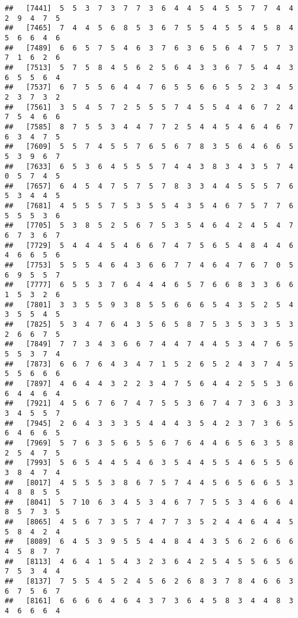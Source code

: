 \documentclass[
]{book}
\begin{document}
\begin{verbatim}
##   [7441]  5  5  3  7  3  7  7  3  6  4  4  5  4  5  5  7  7  4  4  2  9  4  7  5
##   [7465]  7  4  4  5  6  8  5  3  6  7  5  5  4  5  5  4  5  8  4  5  6  6  4  6
##   [7489]  6  6  5  7  5  4  6  3  7  6  3  6  5  6  4  7  5  7  3  7  1  6  2  6
##   [7513]  5  7  5  8  4  5  6  2  5  6  4  3  3  6  7  5  4  4  3  6  5  5  6  4
##   [7537]  6  7  5  5  6  4  4  7  6  5  5  6  6  5  5  2  3  4  5  2  3  7  3  2
##   [7561]  3  5  4  5  7  2  5  5  5  7  4  5  5  4  4  6  7  2  4  7  5  4  6  6
##   [7585]  8  7  5  5  3  4  4  7  7  2  5  4  4  5  4  6  4  6  7  6  3  4  7  5
##   [7609]  5  5  7  4  5  5  7  6  5  6  7  8  3  5  6  4  6  6  5  5  3  9  6  7
##   [7633]  6  5  3  6  4  5  5  5  7  4  4  3  8  3  4  3  5  7  4  0  5  7  4  5
##   [7657]  6  4  5  4  7  5  7  5  7  8  3  3  4  4  5  5  5  7  6  5  3  4  4  5
##   [7681]  4  5  5  5  7  5  3  5  5  4  3  5  4  6  7  5  7  7  6  5  5  5  3  6
##   [7705]  5  3  8  5  2  5  6  7  5  3  5  4  6  4  2  4  5  4  7  6  7  3  6  7
##   [7729]  5  4  4  4  5  4  6  6  7  4  7  5  6  5  4  8  4  4  6  4  6  6  5  6
##   [7753]  5  5  5  4  6  4  3  6  6  7  7  4  6  4  7  6  7  0  5  6  9  5  5  7
##   [7777]  6  5  5  3  7  6  4  4  4  6  5  7  6  6  8  3  3  6  6  1  5  3  2  6
##   [7801]  3  3  5  5  9  3  8  5  5  6  6  6  5  4  3  5  2  5  4  3  5  5  4  5
##   [7825]  5  3  4  7  6  4  3  5  6  5  8  7  5  3  5  3  3  5  3  2  6  6  7  5
##   [7849]  7  7  3  4  3  6  6  7  4  4  7  4  4  5  3  4  7  6  5  5  5  3  7  4
##   [7873]  6  6  7  6  4  3  4  7  1  5  2  6  5  2  4  3  7  4  5  5  5  6  6  6
##   [7897]  4  6  4  4  3  2  2  3  4  7  5  6  4  4  2  5  5  3  6  6  4  4  6  4
##   [7921]  4  5  6  7  6  7  4  7  5  5  3  6  7  4  7  3  6  3  3  3  4  5  5  7
##   [7945]  2  6  4  3  3  3  5  4  4  4  3  5  4  2  3  7  3  6  5  6  4  6  6  5
##   [7969]  5  7  6  3  5  6  5  5  6  7  6  4  4  6  5  6  3  5  8  2  5  4  7  5
##   [7993]  5  6  5  4  4  5  4  6  3  5  4  4  5  5  4  6  5  5  6  3  8  4  7  4
##   [8017]  4  5  5  5  3  8  6  7  5  7  4  4  5  6  5  6  6  5  3  4  8  8  5  5
##   [8041]  5  7 10  6  3  4  5  3  4  6  7  7  5  5  3  4  6  6  4  8  5  7  3  5
##   [8065]  4  5  6  7  3  5  7  4  7  7  3  5  2  4  4  6  4  4  5  5  8  4  2  4
##   [8089]  6  4  5  3  9  5  5  4  4  8  4  4  3  5  6  2  6  6  6  4  5  8  7  7
##   [8113]  4  6  4  1  5  4  3  2  3  6  4  2  5  4  5  5  6  5  6  7  5  3  4  4
##   [8137]  7  5  5  4  5  2  4  5  6  2  6  8  3  7  8  4  6  6  3  6  7  5  6  7
##   [8161]  6  6  6  6  4  6  4  3  7  3  6  4  5  8  3  4  4  8  3  4  6  6  6  4

\end{verbatim}
\end{document}
